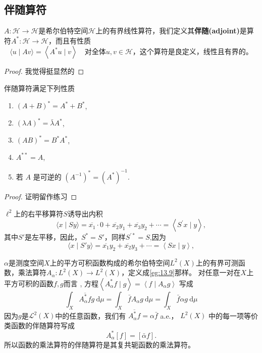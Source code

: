 \subsection{伴随算符}
\(A:\mathcal{H}\rightarrow\mathcal{H}\)是希尔伯特空间\(\mathcal{H}\)上的有界线性算符，我们定义其\textbf{伴随(adjoint)}是算符\(A^*:\mathcal{H}\rightarrow\mathcal{H}\)，而且有性质
\begin{equation}
    \langle u \mid A v\rangle=\left\langle A^{*} u \mid v\right\rangle \quad \text{对全体} u, v \in \mathcal{H}，这个算符是良定义，线性且有界的。
\end{equation}
\begin{proof}
    我觉得挺显然的
\end{proof}
\begin{theorem}
    伴随算符满足下列性质
    \begin{enumerate}[label=\roman*.]
        \item $(A+B)^{*}=A^{*}+B^{*}$,
        \item $(\lambda A)^{*}=\bar{\lambda} A^{*}$,
        \item $(A B)^{*}=B^{*} A^{*}$,
        \item $A^{* *}=A$,
        \item 若 $A$ 是可逆的 $\left(A^{-1}\right)^{*}=\left(A^{*}\right)^{-1}$.
    \end{enumerate}
\end{theorem}
\begin{proof}
    证明留作练习
\end{proof}
\begin{eg}
    \(\ell^2\)上的右平移算符\(S\)诱导出内积
$$
\langle x \mid S y\rangle=\overline{x_{1}} \cdot 0+\overline{x_{2}} y_{1}+\overline{x_{3}} y_{2}+\cdots=\left\langle S^{\prime} x \mid y\right\rangle,
$$
其中\(S'\)是左平移，因此，\(S^{*}=S'\)，同样\(S^{'*}=S\),因为
$$
\langle x \mid S' y\rangle=\overline{x_{1}} y_2+\overline{x_{2}} y_{3}+\cdots=\left\langle S x \mid y\right\rangle,
$$
\end{eg}
\begin{eg}
    \(\alpha\)是测度空间\(X\)上的平方可积函数构成的希尔伯特空间\(L^2(X)\)上的有界可测函数，乘法算符\(A_\alpha:L^2(X)\rightarrow L^2(X)\)，定义成\ref{eg:13.9}那样。 对任意一对在$X$上平方可积的函数$f, g$而言 , 方程$\left\langle A_{\alpha}^{*} f \mid g\right\rangle=\left\langle f \mid A_{\alpha} g\right\rangle$ 写成
$$
\int_{X} \overline{A_{\alpha}^{*} f} g \mathrm{~d} \mu=\int_{X} \bar{f} A_{\alpha} g \mathrm{~d} \mu=\int_{X} \bar{f} \alpha g \mathrm{~d} \mu
$$
因为$g$是$\mathcal{L}^{2}(X)$中的任意函数，我们有 $\overline{A_{\alpha}^{*} f}=\alpha \bar{f}$ a.e.， $L^{2}(X)$ 中的每一项等价类函数的伴随算符写成
$$
A_{\alpha}^{*}[f]=[\bar{\alpha} f] .
$$
所以函数的乘法算符的伴随算符是其复共轭函数的乘法算符。
\end{eg}
